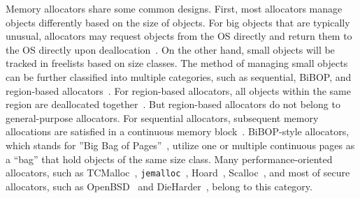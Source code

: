 Memory allocators share some common designs. First, most allocators manage objects differently based on the size of objects. For big objects that are typically unusual, allocators may request objects from the OS directly and return them to the OS directly upon deallocation~\cite{Hoard}. On the other hand, small objects will be tracked in freelists based on size classes. The method of managing small objects can be further classified into multiple categories, such as sequential, BiBOP, and region-based allocators~\cite{DieHarder, Gay:1998:MME:277650.277748}. For region-based allocators, all objects within the same region are deallocated together~\cite{Gay:1998:MME:277650.277748}.  But region-based allocators do not belong to general-purpose allocators. For sequential allocators, subsequent memory allocations are satisfied in a continuous memory block~\cite{Cling}. BiBOP-style allocators, which stands for ''Big Bag of Pages''~\cite{hanson1980portable}, utilize one or multiple continuous pages as a ``bag'' that hold objects of the same size class. Many performance-oriented allocators, such as TCMalloc~\cite{tcmalloc}, \texttt{jemalloc}~\cite{jemalloc}, Hoard~\cite{Hoard}, Scalloc~\cite{Scalloc}, and most of secure allocators, such as OpenBSD~\cite{openbsd} and DieHarder~\cite{DieHarder}, belong to this category. 

 

 